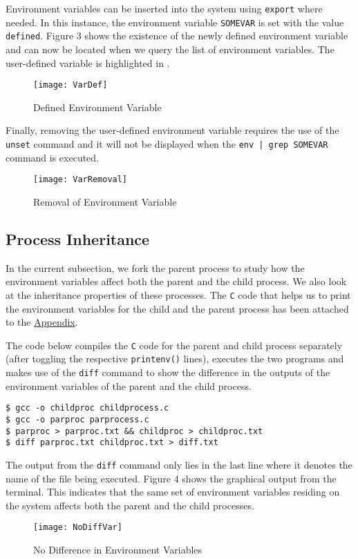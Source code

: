 \documentclass[a4paper,12pt]{article}
\begin{document}
{\par \noindent Environment variables can be inserted into the system using \texttt{export} where needed. In this instance, the environment variable \texttt{SOMEVAR} is set with the value \texttt{defined}. Figure 3 shows the existence of the newly defined environment variable and can now be located when we query the list of environment variables. The user-defined variable is highlighted in .}
\begin{figure}[H]
	\centering
	\texttt{[image: VarDef]}
	\caption{Defined Environment Variable}
	\label{fig:vardef}
\end{figure}
{\par \noindent Finally, removing the user-defined environment variable requires the use of the \texttt{unset} command and it will not be displayed when the \texttt{env | grep SOMEVAR} command is executed.}
\begin{figure}[H]
	\centering
	\texttt{[image: VarRemoval]}
	\caption{Removal of Environment Variable}
	\label{fig:varremoval}
\end{figure}

\subsection{Process Inheritance}
{\par \noindent In the current subsection, we fork the parent process to study how the environment variables affect both the parent and the child process. We also look at the inheritance properties of these processes. The \texttt{C} code that helps us to print the environment variables for the child and the parent process has been attached to the \hyperref[Appsec:3.2]{Appendix}.\\}
{\par \noindent The code below compiles the \texttt{C} code for the parent and child process separately (after toggling the respective \texttt{printenv()} lines), executes the two programs and makes use of the \texttt{diff} command to show the difference in the outputs of the environment variables of the parent and the child process.}
\begin{verbatim}
$ gcc -o childproc childprocess.c
$ gcc -o parproc parprocess.c
$ parproc > parproc.txt && childproc > childproc.txt
$ diff parproc.txt childproc.txt > diff.txt
\end{verbatim}
The output from the \texttt{diff} command only lies in the last line where it denotes the name of the file being executed. Figure 4 shows the graphical output from the terminal. This indicates that the same set of environment variables residing on the system affects both the parent and the child processes.
\begin{figure}[H]
	\centering
	\texttt{[image: NoDiffVar]}
	\caption{No Difference in Environment Variables}
	\label{fig:nodiffvar}
\end{figure}
\end{document}
